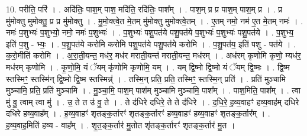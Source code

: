 \documentclass[17pt]{extarticle}
\begin{document}
10. परीति॒ परि॑ । . अदि॑तिः॒ पाश॒म् पाश॒ मदि॑ति॒ रदि॑तिः॒ पाश᳚म् । . पाश॒म् प्र प्र पाश॒म् पाश॒म् प्र । . प्र मु॑मोक्तु मुमोक्तु॒ प्र प्र मु॑मोक्तु । . मु॒मो॒क्त्वे॒त मे॒तम् मु॑मोक्तु मुमोक्त्वे॒तम् । . ए॒तम् नमो॒ नम॑ ए॒त मे॒तम् नमः॑ । . नमः॑ प॒शुभ्यः॑ प॒शुभ्यो॒ नमो॒ नमः॑ प॒शुभ्यः॑ । . प॒शुभ्यः॑ पशु॒पत॑ये पशु॒पत॑ये प॒शुभ्यः॑ प॒शुभ्यः॑ पशु॒पत॑ये । . प॒शुभ्य॒ इति॑ प॒शु - भ्यः॒ । . प॒शु॒पत॑ये करोमि करोमि पशु॒पत॑ये पशु॒पत॑ये करोमि । . प॒शु॒पत॑य॒ इति॑ पशु - पत॑ये । . क॒रो॒मीति॑ करोमि । . अ॒रा॒ती॒यन्त॒ मध॑र॒ मध॑र मराती॒यन्त॑ मराती॒यन्त॒ मध॑रम् । . अध॑रम् कृणोमि कृणो॒ म्यध॑र॒ मध॑रम् कृणोमि । . कृ॒णो॒मि॒ यं ॅयम् कृ॑णोमि कृणोमि॒ यम् । . यम् द्वि॒ष्मो द्वि॒ष्मो यं ॅयम् द्वि॒ष्मः । . द्वि॒ष्म स्तस्मिꣳ॒॒ स्तस्मि॑न् द्वि॒ष्मो द्वि॒ष्म स्तस्मिन्न्॑ । . तस्मि॒न् प्रति॒ प्रति॒ तस्मिꣳ॒॒ स्तस्मि॒न् प्रति॑ । . प्रति॑ मुञ्चामि मुञ्चामि॒ प्रति॒ प्रति॑ मुञ्चामि । . मु॒ञ्चा॒मि॒ पाश॒म् पाश॑म् मुञ्चामि मुञ्चामि॒ पाश᳚म् । . पाश॒मिति॒ पाश᳚म् । . त्वा मु॑ वु॒ त्वाम् त्वा मु॑ । . उ॒ ते त उ॑ वु॒ ते । . ते द॑धिरे दधिरे॒ ते ते द॑धिरे । . द॒धि॒रे॒ ह॒व्य॒वाहꣳ॑ हव्य॒वाह॑म् दधिरे दधिरे हव्य॒वाह᳚म् । . ह॒व्य॒वाहꣳ॑ शृतङ्क॒र्तारꣳ॑ शृतङ्क॒र्तारꣳ॑ हव्य॒वाहꣳ॑ हव्य॒वाहꣳ॑ शृतङ्क॒र्तार᳚म् । . ह॒व्य॒वाह॒मिति॑ हव्य - वाह᳚म् । . शृ॒त॒ङ्क॒र्तार॑ मु॒तोत शृ॑तङ्क॒र्तारꣳ॑ शृतङ्क॒र्तार॑ मु॒त । \newline
\end{document}
